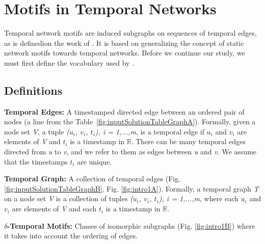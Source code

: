 \documentclass[../../thesis.tex]{subfiles}
\begin{document}
\section{Motifs in Temporal Networks}
\label{sec:motifs_temporal_network}

Temporal network motifs are induced subgraphs on sequences of temporal edges, as is definedion the work of \citeauthor{temporalMotifs}. It is based on generalizing the concept of static network motifs towards temporal networks\cite{temporalMotifs}.  Before we continue our study, we must first define the vocabulary used by \citeauthor{temporalMotifs}.


\subsection{Definitions}
\label{sec:motifs_definitions}

 

\theoremstyle{definition}

\theoremstyle{definition}
\begin{definition}{\textbf{Temporal Edges:}}
A timestamped directed edge between an ordered pair of nodes (a line from the Table~\ref{fig:inputSolutionTableGraphA}). Formally, given a node set \textit{V}, a tuple \textit{($u_{i}$, $v_{i}$, $t_{i}$), i = 1,...,m}, is a temporal edge if \textit{$u_{i}$} and \textit{$v_{i}$} are elements of \textit{V} and \textit{$t_{i}$} is a timestamp in $\mathbb{R}$. There can be many temporal edges directed from \textit{u} to \textit{v}, and we refer to them as edges between \textit{u} and \textit{v}. We assume that the timestamps $t_{i}$ are unique.
\end{definition}
\label{def:temporal_edge}



\theoremstyle{definition}
\begin{definition}{\textbf{Temporal Graph:}}
A collection of temporal edges (Fig. \ref{fig:inputSolutionTableGraphB}, Fig. \ref{fig:intro1A}). Formally, a temporal graph \textit{T} on a node set \textit{V} is a collection of tuples \textit{($u_{i}$, $v_{i}$, $t_{i}$), i = 1,...,m}, where each \textit{$u_{i}$} and \textit{$v_{i}$} are elements of \textit{V} and each \textit{$t_{i}$} is a timestamp in $\mathbb{R}$.

\end{definition}
\label{def:temporal_graph}

\begin{definition}{\textbf{$\delta$-Temporal Motifs:}}
Classes of isomorphic subgraphs (Fig. \ref{fig:intro1B}) where it takes into account the ordering of edges.
\end{definition}
\label{def:delta_temporal_motif}
\end{document}
